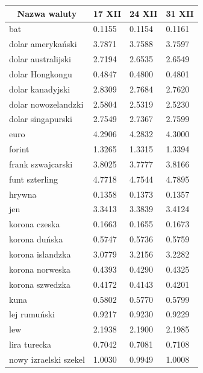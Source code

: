 \documentclass[12pt, a4paper]{article}
\begin{document}
\begin{longtable}{|l|l|l|l|}\hline
  \multicolumn{1}{|c}{\bf Nazwa waluty} & \multicolumn{1}{|c}{\bf 17 XII} & \multicolumn{1}{|c}{\bf 24 XII} & \multicolumn{1}{|c|}{\bf 31 XII} \\\hline
  bat                     & 0.1155 & 0.1154 & 0.1161 \\\hline 
  dolar amerykański       & 3.7871 & 3.7588 & 3.7597 \\\hline 
  dolar australijski      & 2.7194 & 2.6535 & 2.6549 \\\hline 
  dolar Hongkongu         & 0.4847 & 0.4800 & 0.4801 \\\hline 
  dolar kanadyjski        & 2.8309 & 2.7684 & 2.7620 \\\hline 
  dolar nowozelandzki     & 2.5804 & 2.5319 & 2.5230 \\\hline 
  dolar singapurski       & 2.7549 & 2.7367 & 2.7599 \\\hline 
  euro                    & 4.2906 & 4.2832 & 4.3000 \\\hline 
  forint                  & 1.3265 & 1.3315 & 1.3394 \\\hline 
  frank szwajcarski       & 3.8025 & 3.7777 & 3.8166 \\\hline 
  funt szterling          & 4.7718 & 4.7544 & 4.7895 \\\hline 
  hrywna                  & 0.1358 & 0.1373 & 0.1357 \\\hline 
  jen                     & 3.3413 & 3.3839 & 3.4124 \\\hline 
  korona czeska           & 0.1663 & 0.1655 & 0.1673 \\\hline 
  korona duńska           & 0.5747 & 0.5736 & 0.5759 \\\hline 
  korona islandzka        & 3.0779 & 3.2156 & 3.2282 \\\hline 
  korona norweska         & 0.4393 & 0.4290 & 0.4325 \\\hline
  korona szwedzka         & 0.4172 & 0.4143 & 0.4201 \\\hline
  kuna                    & 0.5802 & 0.5770 & 0.5799 \\\hline 
  lej rumuński            & 0.9217 & 0.9230 & 0.9229 \\\hline 
  lew                     & 2.1938 & 2.1900 & 2.1985 \\\hline 
  lira turecka            & 0.7042 & 0.7081 & 0.7108 \\\hline 
  nowy izraelski szekel   & 1.0030 & 0.9949 & 1.0008 \\\hline

\end{longtable}
\end{document}
